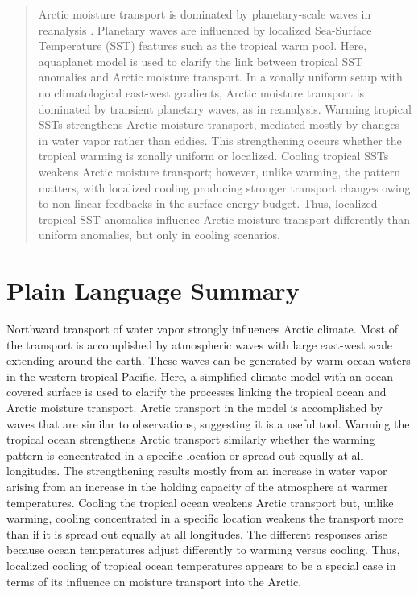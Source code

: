 \documentclass[draft]{agujournal2019}
\begin{document}


\begin{abstract}



Arctic moisture transport is dominated by planetary-scale waves in reanalysis . Planetary waves are influenced by localized Sea-Surface Temperature (SST) features such as the tropical warm pool. Here,  aquaplanet model is used to clarify the link between tropical SST anomalies and  Arctic moisture transport. In a zonally uniform  setup with no climatological east-west gradients, Arctic moisture transport is dominated by transient planetary waves, as in reanalysis. Warming tropical SSTs  strengthens Arctic moisture transport, mediated mostly by changes in water vapor rather than eddies. This strengthening occurs  whether the tropical warming is zonally uniform or localized. Cooling tropical SSTs weakens Arctic moisture transport; however, unlike warming, the pattern matters, with localized cooling producing stronger transport changes owing to non-linear feedbacks in the surface energy budget. Thus,  localized tropical SST anomalies  influence Arctic moisture transport differently than uniform anomalies, but only in cooling scenarios.



\end{abstract}


\section*{Plain Language Summary} 

Northward transport of water vapor strongly influences Arctic climate. Most of the transport is accomplished by atmospheric waves with large east-west scale extending around the earth. These waves can be generated by warm ocean waters in the western tropical Pacific. Here, a simplified climate model with an ocean covered surface is used to clarify the processes linking the tropical ocean and Arctic moisture transport. Arctic transport in the model is accomplished by waves that are similar to observations, suggesting it is a useful tool. Warming the tropical ocean strengthens Arctic transport similarly whether the warming pattern is concentrated in a specific location or spread out equally at all longitudes. The strengthening results mostly from an increase in water vapor arising from an increase in the holding capacity of the atmosphere at warmer temperatures. Cooling the tropical ocean weakens Arctic transport but, unlike warming, cooling concentrated in a specific location weakens the transport more than if it is spread out equally at all longitudes. The different responses arise because ocean temperatures adjust differently to warming versus cooling.  Thus, localized cooling of tropical ocean temperatures appears to be a special case in terms of its influence on moisture transport into the Arctic.
\end{document}
